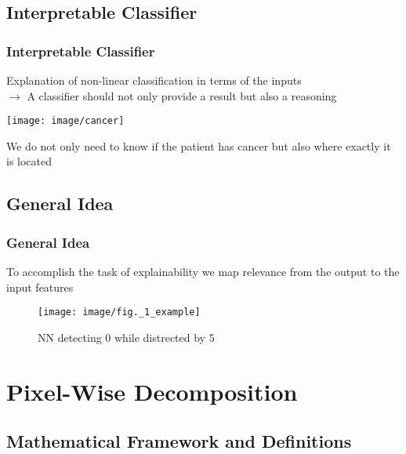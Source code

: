 \documentclass{beamer}
\begin{document}
\subsection[interpretable classifier]{Interpretable Classifier}
\begin{frame}
\frametitle{Interpretable Classifier} 
\vspace{0.5cm}
Explanation of non-linear classification in terms of the inputs\\
$\rightarrow$ A classifier should not only provide a result but also a reasoning

\begin{center}
\texttt{[image: image/cancer]}
\end{center}

We do not only need to know if the patient has cancer but also where exactly it is located

\end{frame}



\subsection[General Idea]{General Idea}


\begin{frame}
\frametitle{General Idea} 
\vspace{0.35cm}
To accomplish the task of explainability we map relevance from the output to the input features

\vspace{0.25cm}

\begin{center}
\begin{figure}
\texttt{[image: image/fig.\_1\_example]}
\caption{NN detecting 0 while distrected by 5}
\end{figure}
\end{center}

\end{frame}




\section[Pixel-Wise Decomposition]{Pixel-Wise Decomposition}

\subsection[Mathematical Framework and Definitions]{Mathematical Framework and Definitions}
\end{document}
